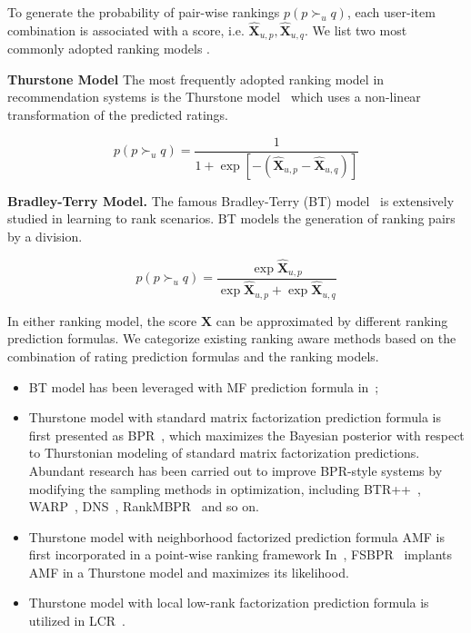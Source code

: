 \documentclass[letterpaper]{article} %
\newcommand{\Rating}{\mathbf{X}}
\begin{document}
To generate the probability of pair-wise rankings $p(p\succ_u q)$,  each user-item combination is associated with a score, i.e. $\hat{\Rating}_{u,p},\hat{\Rating}_{u,q}$.  We list two most commonly adopted ranking models . 


\textbf{Thurstone Model} The most frequently adopted ranking model in recommendation systems is the Thurstone model~\cite{Thurstone1927law} which uses a non-linear transformation of the predicted ratings. 

\begin{equation}
p(p\succ_u q) = \frac{1} {1+\exp[-(\hat{\Rating}_{u,p}-\hat{\Rating}_{u,q})]}
\end{equation}

\textbf{Bradley-Terry Model.} The famous Bradley-Terry (BT) model~\cite{Hunter2004MM} is extensively studied in learning to rank scenarios. BT models the generation of ranking pairs by a division.

\begin{equation}\label{equ:BT}
p(p\succ_u q) = \frac{\exp{\hat{\Rating}_{u,p}}}{\exp{\hat{\Rating}_{u,p}}+ \exp{\hat{\Rating}_{u,q}}} 
\end{equation}


In either ranking model, the score $\hat{\Rating}$ can be approximated by different ranking prediction formulas. We categorize existing ranking aware methods based on the combination of rating prediction formulas and the ranking models. 
\begin{itemize}
\item BT model has been leveraged with MF prediction formula in~\cite{Hu2016Improved};
\item Thurstone model with standard matrix factorization prediction formula is first presented as BPR~\cite{Rendle2009BPR}, which maximizes the Bayesian posterior with respect to Thurstonian modeling of standard matrix factorization predictions. Abundant research has been carried out to improve BPR-style systems by modifying the sampling methods in optimization, including BTR++~\cite{Lerche2014Using}, WARP~\cite{Weston2011Wsabie}, DNS~\cite{Zhang2013Optimizing}, RankMBPR~\cite{Yu2016RankMBPR} and so on.
\item Thurstone model with  neighborhood factorized prediction formula AMF is first incorporated in a point-wise ranking framework In~\cite{Steck2015Gaussian},  FSBPR~\cite{Zhao2018Factored} implants AMF in a Thurstone model and maximizes its likelihood.
\item Thurstone model with local low-rank factorization prediction formula is utilized in LCR~\cite{Lee2014Local}.
 \end{itemize}
\end{document}
